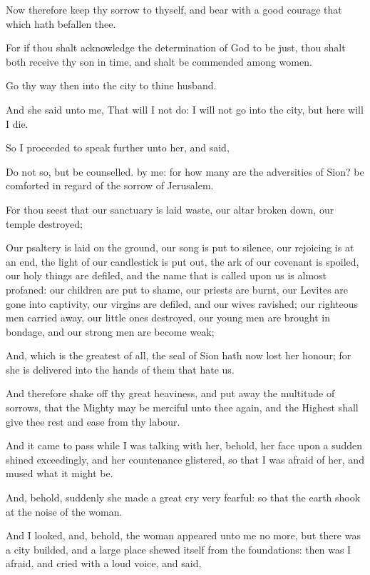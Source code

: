 {\par }{\PP {}Now therefore keep thy sorrow to thyself, and bear with a good courage that which hath befallen thee.
\par }{\PP {}For if thou shalt acknowledge the determination of God to be just, thou shalt both receive thy son in time, and shalt be commended among women.
\par }{\PP {}Go thy way then into the city to thine husband.
\par }{\PP {}And she said unto me, That will I not do: I will not go into the city, but here will I die.
\par }{\PP {}So I proceeded to speak further unto her, and said,
\par }{\PP {}Do not so, but be counselled. by me: for how many are the adversities of Sion? be comforted in regard of the sorrow of Jerusalem.
\par }{\PP {}For thou seest that our sanctuary is laid waste, our altar broken down, our temple destroyed;
\par }{\PP {}Our psaltery is laid on the ground, our song is put to silence, our rejoicing is at an end, the light of our candlestick is put out, the ark of our covenant is spoiled, our holy things are defiled, and the name that is called upon us is almost profaned: our children are put to shame, our priests are burnt, our Levites are gone into captivity, our virgins are defiled, and our wives ravished; our righteous men carried away, our little ones destroyed, our young men are brought in bondage, and our strong men are become weak;
\par }{\PP {}And, which is the greatest of all, the seal of Sion hath now lost her honour; for she is delivered into the hands of them that hate us.
\par }{\PP {}And therefore shake off thy great heaviness, and put away the multitude of sorrows, that the Mighty may be merciful unto thee again, and the Highest shall give thee rest and ease from thy labour.
\par }{\PP {}And it came to pass while I was talking with her, behold, her face upon a sudden shined exceedingly, and her countenance glistered, so that I was afraid of her, and mused what it might be.
\par }{\PP {}And, behold, suddenly she made a great cry very fearful: so that the earth shook at the noise of the woman.
\par }{\PP {}And I looked, and, behold, the woman appeared unto me no more, but there was a city builded, and a large place shewed itself from the foundations: then was I afraid, and cried with a loud voice, and said,
}

